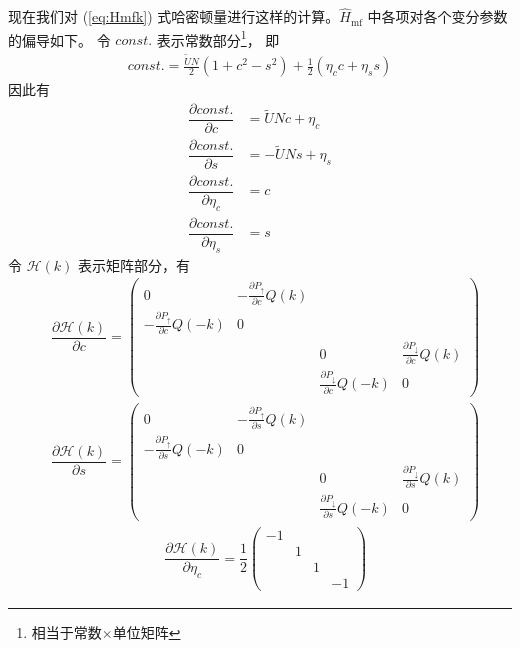 现在我们对 (\ref{eq:Hmfk}) 式哈密顿量进行这样的计算。$\hat{H}_{\text{mf}}$ 中各项对各个变分参数的偏导如下。
令 $const.$ 表示常数部分\footnote{相当于常数$\times$单位矩阵}，
即 
\begin{align}
const. = \frac{\tilde{U}N}{2}(1+c^2-s^2) + \frac{1}{2}(\eta_cc+\eta_ss)
\end{align}
因此有
\begin{align}
\dfrac{\partial const.}{\partial c} &= \tilde{U}Nc+\eta_c \\
\dfrac{\partial const.}{\partial s} &= -\tilde{U}Ns+\eta_s \\
\dfrac{\partial const.}{\partial \eta_c} &= c \\
\dfrac{\partial const.}{\partial \eta_s} &= s 
\end{align}
令 $\mathcal{H}(k)$ 表示矩阵部分，有
\begin{align}
    & \dfrac{\partial\mathcal{H}(k)}{\partial c}=
        \begin{pmatrix}
            0 & -\frac{\partial P_{\uparrow}}{\partial c}Q(k) & & \\
            -\frac{\partial P_{\uparrow}}{\partial c}Q(-k) & 0 & & \\
            & & 0 & \frac{\partial P_{\downarrow}}{\partial c}Q(k) \\
            & & \frac{\partial P_{\downarrow}}{\partial c}Q(-k) & 0 
        \end{pmatrix}
\end{align}
\begin{align}
    & \dfrac{\partial\mathcal{H}(k)}{\partial s}=
        \begin{pmatrix}
            0 & -\frac{\partial P_{\uparrow}}{\partial s}Q(k) & & \\
            -\frac{\partial P_{\uparrow}}{\partial s}Q(-k) & 0 & & \\
            & & 0 & \frac{\partial P_{\downarrow}}{\partial s}Q(k) \\
            & & \frac{\partial P_{\downarrow}}{\partial s}Q(-k) & 0 
        \end{pmatrix}
\end{align}
\begin{align}
    & \dfrac{\partial\mathcal{H}(k)}{\partial \eta_c}=\dfrac{1}{2}
        \begin{pmatrix}
            -1 & & & \\
            & 1 & & \\
            & & 1 & \\
            & & & -1 
        \end{pmatrix}
\end{align}
